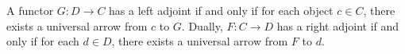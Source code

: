 A functor $G: D \rightarrow C$ has a left adjoint if and only if for each object $c \in C$, there exists a universal arrow from $c$ to $G$. Dually, $F: C \rightarrow D$ has a right adjoint if and only if for each $d \in D$, there exists a universal arrow from $F$ to $d$.